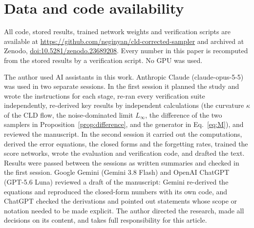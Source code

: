 \section*{Data and code availability}
All code, stored results, trained network weights and verification scripts are available at \url{https://github.com/neginyan/cld-corrected-sampler} and archived at Zenodo, \href{https://doi.org/10.5281/zenodo.23689208}{doi:10.5281/zenodo.23689208}.
Every number in this paper is recomputed from the stored results by a verification script.
No GPU was used.

\begin{acknowledgments}
The author used AI assistants in this work. Anthropic Claude (\mbox{claude-opus-5-5}) was used in two separate sessions. In the first session it planned the study and wrote the instructions for each stage, re-ran every verification suite independently, re-derived key results by independent calculations (the curvature $\kappa$ of the CLD flow, the noise-dominated limit $L_\infty$, the difference of the two samplers in Proposition~\ref{prop:difference}, and the generator in Eq.~\eqref{eq:M}), and reviewed the manuscript. In the second session it carried out the computations, derived the error equations, the closed forms and the forgetting rates, trained the score networks, wrote the evaluation and verification code, and drafted the text. Results were passed between the sessions as written summaries and checked in the first session. Google Gemini (Gemini 3.8 Flash) and OpenAI ChatGPT (GPT-5.6 Luna) reviewed a draft of the manuscript: Gemini re-derived the equations and reproduced the closed-form numbers with its own code, and ChatGPT checked the derivations and pointed out statements whose scope or notation needed to be made explicit. The author directed the research, made all decisions on its content, and takes full responsibility for this article.
\end{acknowledgments}
